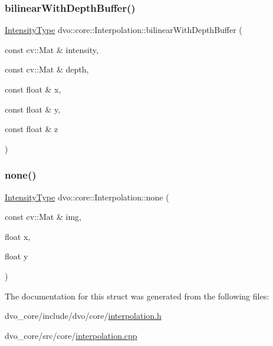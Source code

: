 \mbox{\label{structdvo_1_1core_1_1_interpolation_a25af1de0ec0b6547e9f06b70abb18e0b}} 
\subsubsection{\texorpdfstring{bilinear\+With\+Depth\+Buffer()}{bilinearWithDepthBuffer()}}
{\footnotesize\ttfamily \mbox{\hyperlink{namespacedvo_1_1core_a59740d7c1f271a6ec8cb2b5c42e7a3f2}{Intensity\+Type}} dvo\+::core\+::\+Interpolation\+::bilinear\+With\+Depth\+Buffer (\begin{DoxyParamCaption}\item[{const cv\+::\+Mat \&}]{intensity,  }\item[{const cv\+::\+Mat \&}]{depth,  }\item[{const float \&}]{x,  }\item[{const float \&}]{y,  }\item[{const float \&}]{z }\end{DoxyParamCaption})\hspace{0.3cm}{\ttfamily [static]}}

\mbox{\label{structdvo_1_1core_1_1_interpolation_a5ea50138a3a09dbbbc056e2b67526dfd}} 
\subsubsection{\texorpdfstring{none()}{none()}}
{\footnotesize\ttfamily \mbox{\hyperlink{namespacedvo_1_1core_a59740d7c1f271a6ec8cb2b5c42e7a3f2}{Intensity\+Type}} dvo\+::core\+::\+Interpolation\+::none (\begin{DoxyParamCaption}\item[{const cv\+::\+Mat \&}]{img,  }\item[{float}]{x,  }\item[{float}]{y }\end{DoxyParamCaption})\hspace{0.3cm}{\ttfamily [static]}}



The documentation for this struct was generated from the following files\+:\begin{DoxyCompactItemize}
\item 
dvo\+\_\+core/include/dvo/core/\mbox{\hyperlink{interpolation_8h}{interpolation.\+h}}\item 
dvo\+\_\+core/src/core/\mbox{\hyperlink{interpolation_8cpp}{interpolation.\+cpp}}\end{DoxyCompactItemize}
